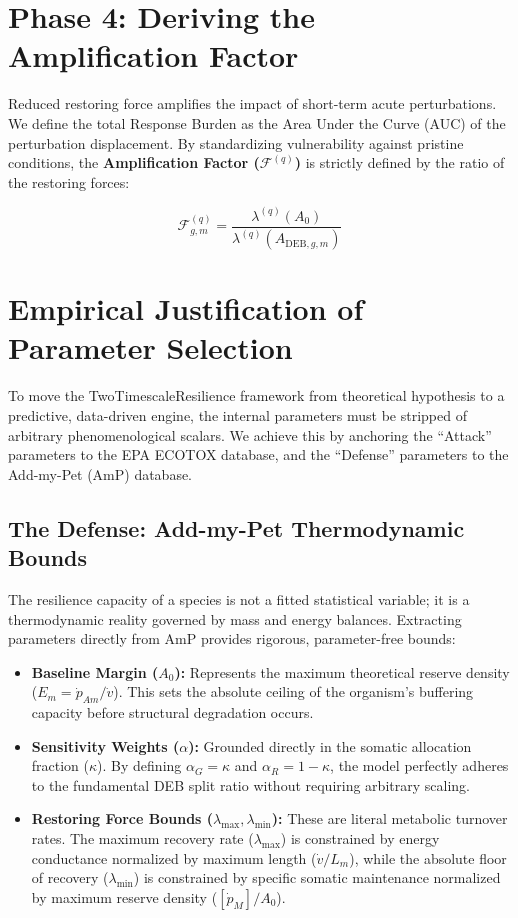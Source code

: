 \documentclass[11pt,a4paper]{article}
\begin{document}
\section{Phase 4: Deriving the Amplification Factor}

Reduced restoring force amplifies the impact of short-term acute perturbations. We define the total Response Burden as the Area Under the Curve (AUC) of the perturbation displacement. By standardizing vulnerability against pristine conditions, the \textbf{Amplification Factor ($\mathcal{F}^{(q)}$)} is strictly defined by the ratio of the restoring forces:

\begin{equation}
\boxed{ \mathcal{F}_{g,m}^{(q)} = \frac{\lambda^{(q)}(A_0)}{\lambda^{(q)}(A_{\mathrm{DEB},g,m})} }
\end{equation}


\section{Empirical Justification of Parameter Selection}

To move the TwoTimescaleResilience framework from theoretical hypothesis to a predictive, data-driven engine, the internal parameters must be stripped of arbitrary phenomenological scalars. We achieve this by anchoring the ``Attack'' parameters to the EPA ECOTOX database, and the ``Defense'' parameters to the Add-my-Pet (AmP) database.

\subsection{The Defense: Add-my-Pet Thermodynamic Bounds}
The resilience capacity of a species is not a fitted statistical variable; it is a thermodynamic reality governed by mass and energy balances. Extracting parameters directly from AmP provides rigorous, parameter-free bounds:
\begin{itemize}
    \item \textbf{Baseline Margin ($A_0$):} Represents the maximum theoretical reserve density ($E_m = \dot{p}_{Am} / \dot{v}$). This sets the absolute ceiling of the organism's buffering capacity before structural degradation occurs.
    \item \textbf{Sensitivity Weights ($\alpha$):} Grounded directly in the somatic allocation fraction ($\kappa$). By defining $\alpha_G = \kappa$ and $\alpha_R = 1-\kappa$, the model perfectly adheres to the fundamental DEB split ratio without requiring arbitrary scaling.
    \item \textbf{Restoring Force Bounds ($\lambda_{\max}, \lambda_{\min}$):} These are literal metabolic turnover rates. The maximum recovery rate ($\lambda_{\max}$) is constrained by energy conductance normalized by maximum length ($\dot{v}/L_m$), while the absolute floor of recovery ($\lambda_{\min}$) is constrained by specific somatic maintenance normalized by maximum reserve density ($[\dot{p}_M]/A_0$).
\end{itemize}
\end{document}
